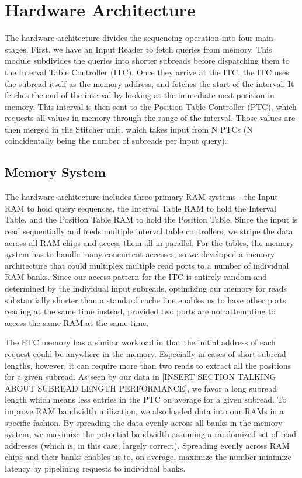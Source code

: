 \documentclass[11pt]{article}
\begin{document}
\section{Hardware Architecture}

The hardware architecture divides the sequencing operation into four main stages.  First, we have an Input Reader to fetch queries from memory.  This module subdivides the queries into shorter subreads before dispatching them to the Interval Table Controller (ITC).  Once they arrive at the ITC, the ITC uses the subread itself as the memory address, and fetches the start of the interval.  It fetches the end of the interval by looking at the immediate next position in memory.  This interval is then sent to the Position Table Controller (PTC), which requests all values in memory through the range of the interval.  Those values are then merged in the Stitcher unit, which takes input from N PTCs (N coincidentally being the number of subreads per input query).

\subsection{Memory System}
The hardware architecture includes three primary RAM systems - the Input RAM to hold query sequences, the Interval Table RAM to hold the Interval Table, and the Position Table RAM to hold the Position Table.  Since the input is read sequentially and feeds multiple interval table controllers, we  stripe the data across all RAM chips and access them all in parallel.  For the tables, the memory system has to handle many concurrent accesses, so we developed a memory architecture that could multiplex multiple read ports to a number of individual RAM banks.  Since our access pattern for the ITC is entirely random and determined by the individual input subreads, optimizing our memory for reads substantially shorter than a standard cache line enables us to have other ports reading at the same time instead, provided two ports are not attempting to access the same RAM at the same time.


The PTC memory has a similar workload in that the initial address of each request could be anywhere in the memory.  Especially in cases of short subread lengths, however, it can require more than two reads to extract all the positions for a given subread.  As seen by our data in [INSERT SECTION TALKING ABOUT SUBREAD LENGTH PERFORMANCE], we favor a long subread length which means less entries in the PTC on average for a given subread.  To improve RAM bandwidth utilization, we also loaded data into our RAMs in a specific fashion.  By spreading the data evenly across all banks in the memory system, we maximize the potential bandwidth assuming a randomized set of read addresses (which is, in this case, largely correct).  Spreading evenly across RAM chips and their banks enables us to, on average, maximize the number minimize latency by pipelining requests to individual banks.
\end{document}
